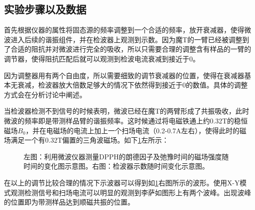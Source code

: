 \documentclass[aps,pre,12pt,preprint,onecolumn,showpacs,showkeys,UTF8]{revtex4-1}
\begin{document}
\subsection{实验步骤以及数据}

首先根据仪器的属性将固态源的频率调整到一个合适的频率，放开衰减器，使得微波进入后续的谐振组件，并在检波器上观测到示数。因为魔T的一臂已经被调整到了合适的阻抗并对微波进行完全的吸收，所以只需要合理的调整含有样品的一臂的调节器，使得阻抗匹配后就可以观测到检波电流衰减到接近于0。

因为调整器用有两个自由度，所以需要细致的调节衰减器的位置，使得在衰减器基本无衰减，检波器放大倍数足够大的情况下依然得到接近于0的数值。具体的调整方式会在分析讨论中阐述。

当检波器检测不到信号的时候表明，微波已经在魔T的两臂形成了共振吸收，此时微波的频率即是带测样品臂的谐振频率。这时候通过将电磁铁通上约0.32T的稳恒磁场$B_0$，并在电磁场的电流上加上一个扫场电流（0.2-0.7A左右），使得此时的磁场满足一个有0.32T偏置的三角波磁场。如下\ref{fig:exp2}左所示：

\begin{figure}[h]
	\begin{center}
		\caption{\label{fig:exp2}左图：利用微波仪器测量DPPH的朗德因子及弛豫时间的磁场强度随时间的变化图示意图。右图：检波器示数随时间变化示意图。}
	\end{center}
\end{figure}

在以上的调节比较合理的情况下示波器可以得到如\ref{fig:exp2}右图所示的波形。使用X-Y模式观测检测信号和扫场电流可以明显的观测到李萨如图形上有两个波峰。出现波峰的位置即为带测样品达到顺磁共振的位置。
\end{document}
